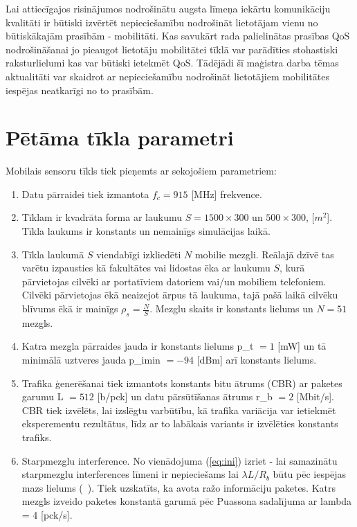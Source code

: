 Lai attiecīgajos risinājumos nodrošinātu augsta līmeņa iekārtu komunikāciju kvalitāti ir būtiski izvērtēt nepieciešamību nodrošināt lietotājam vienu no būtiskākajām prasībām - mobilitāti. Kas savukārt rada palielinātas prasības QoS nodrošināšanai jo pieaugot lietotāju mobilitātei tīklā var parādīties stohastiski raksturlielumi kas var būtiski ietekmēt QoS. Tādējādi šī maģistra darba tēmas aktualitāti var skaidrot ar nepieciešamību nodrošināt lietotājiem mobilitātes iespējas neatkarīgi no to prasībām.

\section{Pētāma tīkla parametri }\label{sec:petPar}
Mobilais sensoru tīkls tiek pieņemts ar sekojošiem parametriem:
\begin{enumerate}
	\item Datu pārraidei tiek izmantota $f_{c} = 915$ [MHz] frekvence.
 	\item Tīklam ir kvadrāta forma ar laukumu $S = 1500\times300$ un $500\times300$, [$m^{2}$]. Tīkla laukums ir konstants un nemainīgs simulācijas laikā.
  	\item Tīkla laukumā $S$ viendabīgi izkliedēti $N$ mobilie mezgli. Reālajā dzīvē tas varētu izpausties kā fakultātes vai lidostas ēka ar laukumu $S$, kurā pārvietojas cilvēki ar portatīviem datoriem vai/un mobiliem telefoniem. Cilvēki pārvietojas ēkā neaizejot ārpus tā laukuma, tajā pašā laikā cilvēku blīvums ēkā ir mainīgs $\rho_{s} = \frac{N}{S}$.  Mezglu skaits ir konstants lielums un $N = 51$ mezgls.
  	\item Katra mezgla pārraides jauda ir konstants lielums \gls{p_t} $= 1$ [mW] un tā minimālā uztveres jauda \gls{p_imin} $= - 94$ [dBm] arī konstants lielums.
  	\item Trafika ģenerēšanai tiek izmantots konstants bitu ātrums (\acs{CBR}) ar paketes garumu \gls{L} $= 512$ [b/pck] un datu pārsūtīšanas ātrums \gls{r_b} $= 2$ [Mbit/s]. CBR tiek izvēlēts, lai izslēgtu varbūtību, kā trafika variācija var ietiekmēt eksperementu rezultātus, līdz ar to labākais variants ir izvēlēties konstants trafiks. 
  	\item Starpmezglu interference. No vienādojuma (\ref{eq:ini}) izriet - lai samazinātu starpmezglu interferences līmeni ir nepieciešams lai $\lambda L/R_{b}$ būtu pēc iespējas mazs lielums (\seename~\cite{qoS_static}). Tiek uzskatīts, ka avota ražo informāciju  paketes. Katrs mezgls izveido paketes konstantā garumā pēc Puassona sadalījuma ar \gls{lambda} = 4 [pck/s].

\end{enumerate}
